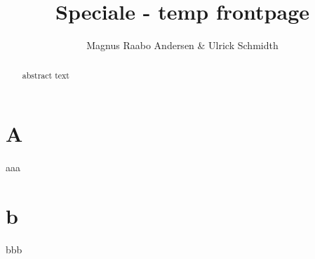 \documentclass[a4paper]{article}
\title{Speciale - temp frontpage}
\author{Magnus Raabo Andersen \& Ulrick Schmidth}
\numberwithin{equation}{section}
\begin{document}
\maketitle
\thispagestyle{empty}
\newpage
\begin{abstract}
    abstract text
\end{abstract} \thispagestyle{empty}
\newpage
\tableofcontents \thispagestyle{empty}
\newpage
\listoffigures \thispagestyle{empty}
\newpage
\listoftables \thispagestyle{empty}
\newpage
\setcounter{page}{1}


\section{A}
aaa
\newpage
\section{b}
bbb

\end{document}
